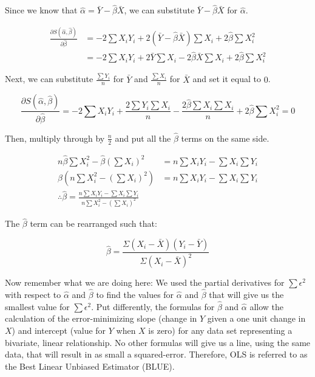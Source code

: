 \documentclass[11pt,openany]{book}\usepackage[]{graphicx}\usepackage[]{color}
\begin{document}
{\noindent Since we know that $\hat{\alpha} = \bar {Y}-\hat{\beta} \bar{X}$, we can substitute $\bar {Y}-\hat{\beta}
\bar{X}$ for $\hat{\alpha}$. 

\begin{align*}
\frac{\partial S(\hat{\alpha},\hat{\beta})}{\partial \hat{\beta}} &= -2 \sum X_{i}Y_{i}+2(\bar {Y}-\hat{\beta}
\bar{X})\sum X_{i} + 2\hat{\beta} \sum X^{2}_{i} \\
&= -2 \sum X_{i}Y_{i}+2 \bar{Y} \sum X_{i}-2\hat{\beta} \bar{X} \sum X_{i} + 2\hat{\beta}
\sum X^{2}_{i} 
\end{align*}

\noindent Next, we can substitute $\frac{\sum Y_{i}}{n}$ for $\bar{Y}$ and $\frac{\sum X_{i}}{n}$ for $\bar{X}$ and set it equal to $0$. 

\begin{equation*}
\frac{\partial S(\hat{\alpha},\hat{\beta})}{\partial \hat{\beta}} = -2 \sum X_{i}Y_{i}+\frac{2\sum Y_{i}
  \sum X_{i}}{n}-\frac{2\hat{\beta}\sum X_{i} \sum X_{i}}{n}+ 2\hat{\beta}
\sum X^{2}_{i} = 0
\end{equation*}

\noindent Then, multiply through by $\frac{n}{2}$ and put all the $\hat{\beta}$ terms on the same side. 

\begin{align*}
n\hat{\beta} \sum X^{2}_{i}-\hat{\beta}(\sum X_{i})^{2} &= n \sum X_{i}Y_{i}-\sum X_{i}
\sum Y_{i} \\
\hat{\beta}(n \sum X^{2}_{i}-(\sum X_{i})^{2}) &= n \sum X_{i}Y_{i}-\sum X_{i}
\sum Y_{i} \\
\therefore \hat{\beta} = \frac{n \sum X_{i}Y_{i}-\sum X_{i}
\sum Y_{i}}{n\sum X^{2}_{i}-(\sum X_{i})^{2}}
\end{align*}

\noindent The $\hat{\beta}$ term can be rearranged such that: 

\begin{equation}
\label{eq:B}  
\hat{\beta}=\frac{\Sigma(X_{i}-\bar X)(Y_{i}-\bar Y)}{\Sigma(X_{i}-\bar X)^2}  
\end{equation}

Now remember what we are doing here: We used the partial derivatives for $\sum \epsilon^{2}$ with respect to $\hat{\alpha}$ and $\hat{\beta}$ to find the values for $\hat{\alpha}$ and $\hat{\beta}$ that will give us the smallest value for $\sum \epsilon^{2}$.  Put differently, the formulas for $\hat{\beta}$ and $\hat{\alpha}$ allow the calculation of the error-minimizing slope (change in $Y$ given a one unit change in $X$) and intercept (value for $Y$ when $X$ is zero) for any data set representing a bivariate, linear relationship. No other formulas will give us a line, using the same data, that will result in as small a squared-error. Therefore, OLS is referred to as the Best Linear Unbiased Estimator (BLUE).  

}
\end{document}
